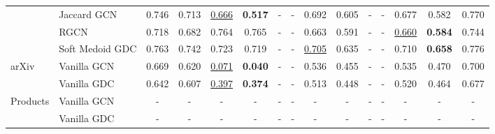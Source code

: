 \documentclass[letterpaper]{article} %
\begin{document}
\begin{table*}[ht]
{\begin{tabular}{llccccccccccccc}
                              & Jaccard GCN                                        & 0.746       & 0.713      & \underline{0.666} & \textbf{0.517} & -                 & -     & 0.692               & 0.605           & -                 & -              & 0.677             & 0.582          & 0.770             \\
                              & RGCN                                               & 0.718       & 0.682      & 0.764             & 0.765          & -                 & -     & 0.663               & 0.591           & -                 & -              & \underline{0.660} & \textbf{0.584} & 0.744             \\
                              & Soft Medoid GDC                                    & 0.763       & 0.742      & 0.723             & 0.719          & -                 & -     & \underline{0.705}   & 0.635           & -                 & -              & 0.710             & \textbf{0.658} & 0.776             \\
    \cline{1-15}
    \multirow{2}{*}{arXiv}    & Vanilla GCN                                        & 0.669       & 0.620      & \underline{0.071} & \textbf{0.040} & -                 & -     & 0.536               & 0.455           & -                 & -              & 0.535             & 0.470          & 0.700             \\
                              & Vanilla GDC                                        & 0.642       & 0.607      & \underline{0.397} & \textbf{0.374} & -                 & -     & 0.513               & 0.448           & -                 & -              & 0.520             & 0.464          & 0.677             \\
    \cline{1-15}
    \multirow{2}{*}{Products} & Vanilla GCN                                        & -           & -          & -                 & -              & -                 & -     & -                   & -               & -                 & -              & -                 & -              & -                 \\
                              & Vanilla GDC                                        & -           & -          & -                 & -              & -                 & -     & -                   & -               & -                 & -              & -                 & -              & -                 \\
    \bottomrule
    \end{tabular}
}
\end{table*}
\end{document}
